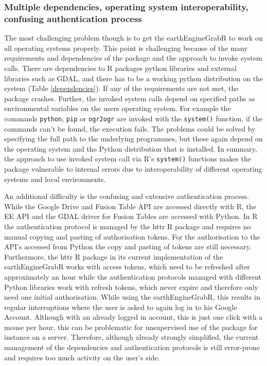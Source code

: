 \subsubsection{Multiple dependencies, operating system interoperability, confusing authentication process}

The most challenging problem though is to get the earthEngineGrabR to work on all operating systems properly. This point is challenging because of the many requirements and dependencies of the package and the approach to invoke system calls. There are dependencies to R packages python libraries and external libraries such as GDAL, and there has to be a working python distribution on the system (Table \ref{dependencies}). If any of the requirements are not met, the package crashes. 
Further, the invoked system calls depend on specified paths as environmental variables on the users operating system. For example the commands \texttt{python}, \texttt{pip} or \texttt{ogr2ogr} are invoked with the \texttt{system()} function, if the commands can't be found, the execution fails. The problems could be solved by specifying the full path to the underlying programmes, but these again depend on the operating system and the Python distribution that is installed. In summary, the approach to use invoked system call via R's \texttt{system()} functions makes the package vulnerable to internal errors due to interoperability of different operating systems and local environments.

An additional difficulty is the confusing and extensive authentication process. While the Google Drive and Fusion Table API are accessed directly with R, the EE API and the GDAL driver for Fusion Tables are accessed with Python. In R the authentication protocol is managed by the httr R package and requires no manual copying and pasting of authorisation tokens. For the authorisation to the API's accessed from Python the copy and pasting of tokens are still necessary. 
Furthermore, the httr R package in its current implementation of the earthEngineGrabR works with access tokens, which need to be refreshed after approximately an hour while the authentication protocols managed with different Python libraries work with refresh tokens, which never expire and therefore only need one initial authorisation. While using the earthEngineGrabR, this results in regular interruptions where the user is asked to again log in to his Google Account. Although with an already logged in account, this is just one click with a mouse per hour, this can be problematic for unsupervised use of the package for instance on a  server. Therefore, although already strongly simplified, the current management of the dependencies and authentication protocols is still error-prone and requires too much activity on the user's side.

